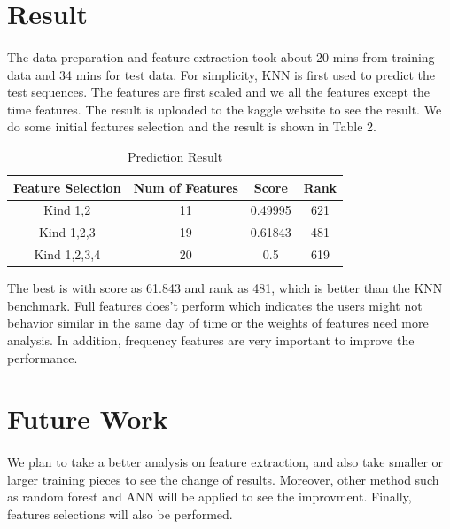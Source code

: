 \documentclass{article}
\begin{document}
	\section{Result} %
	\label{sec:result}
	\paragraph{} The data preparation and feature extraction took about 20 mins from training data and 34 mins for test data. For simplicity, KNN is first used to predict the test sequences. The features are first scaled and we all the features except the time features. The result is uploaded to the kaggle website to see the result. We do some initial features selection and the result is shown in Table 2. 
	\begin{table}
		\centering
		\caption{Prediction Result}
		\begin{tabular}{c|c|c|c}
			Feature Selection & Num of Features & Score & Rank \\ \hline
			Kind 1,2 & 11 & 0.49995 & 621 \\ 
			Kind 1,2,3 & 19 & 0.61843 & 481 \\ 
			Kind 1,2,3,4 & 20 & 0.5 & 619 \\
		\end{tabular}
	\end{table}
	The best is with score as 61.843 and rank as 481, which is better than the KNN benchmark. Full features does't perform which indicates the users might not behavior similar in the same day of time or the weights of features need more analysis. In addition, frequency features are very important to improve the performance. 
	
	
	
	\section{Future Work} %
	\label{sec:future_work}
	\paragraph{} We plan to take a better analysis on feature extraction, and also take smaller or larger training pieces to see the change of results. Moreover, other method such as random forest and ANN will be applied to see the improvment. Finally, features selections will also be performed. 
	
\end{document}
